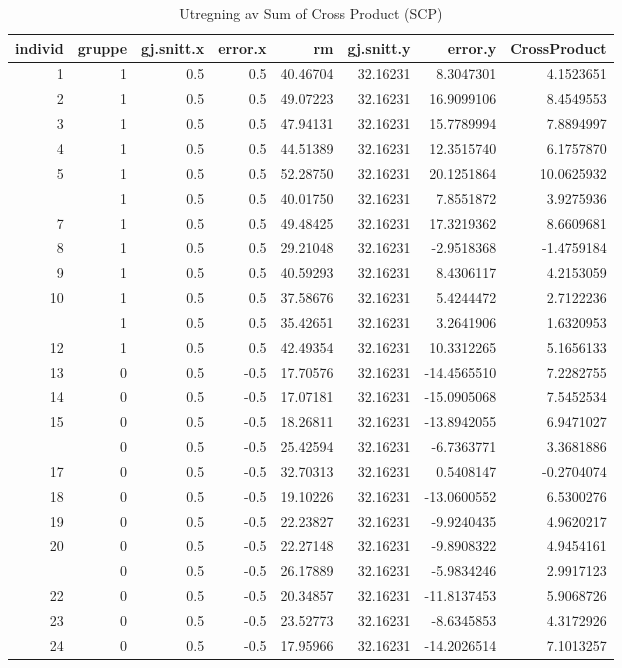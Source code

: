 \documentclass[
]{book}
\begin{document}
\begin{table}

\caption{\label{tab:unnamed-chunk-2}Utregning av Sum of Cross Product (SCP)}
\centering
\begin{tabular}[t]{rrrrrrrr}
\toprule
individ & gruppe & gj.snitt.x & error.x & rm & gj.snitt.y & error.y & CrossProduct\\
\midrule
1 & 1 & 0.5 & 0.5 & 40.46704 & 32.16231 & 8.3047301 & 4.1523651\\
2 & 1 & 0.5 & 0.5 & 49.07223 & 32.16231 & 16.9099106 & 8.4549553\\
3 & 1 & 0.5 & 0.5 & 47.94131 & 32.16231 & 15.7789994 & 7.8894997\\
4 & 1 & 0.5 & 0.5 & 44.51389 & 32.16231 & 12.3515740 & 6.1757870\\
5 & 1 & 0.5 & 0.5 & 52.28750 & 32.16231 & 20.1251864 & 10.0625932\\
\addlinespace
6 & 1 & 0.5 & 0.5 & 40.01750 & 32.16231 & 7.8551872 & 3.9275936\\
7 & 1 & 0.5 & 0.5 & 49.48425 & 32.16231 & 17.3219362 & 8.6609681\\
8 & 1 & 0.5 & 0.5 & 29.21048 & 32.16231 & -2.9518368 & -1.4759184\\
9 & 1 & 0.5 & 0.5 & 40.59293 & 32.16231 & 8.4306117 & 4.2153059\\
10 & 1 & 0.5 & 0.5 & 37.58676 & 32.16231 & 5.4244472 & 2.7122236\\
\addlinespace
11 & 1 & 0.5 & 0.5 & 35.42651 & 32.16231 & 3.2641906 & 1.6320953\\
12 & 1 & 0.5 & 0.5 & 42.49354 & 32.16231 & 10.3312265 & 5.1656133\\
13 & 0 & 0.5 & -0.5 & 17.70576 & 32.16231 & -14.4565510 & 7.2282755\\
14 & 0 & 0.5 & -0.5 & 17.07181 & 32.16231 & -15.0905068 & 7.5452534\\
15 & 0 & 0.5 & -0.5 & 18.26811 & 32.16231 & -13.8942055 & 6.9471027\\
\addlinespace
16 & 0 & 0.5 & -0.5 & 25.42594 & 32.16231 & -6.7363771 & 3.3681886\\
17 & 0 & 0.5 & -0.5 & 32.70313 & 32.16231 & 0.5408147 & -0.2704074\\
18 & 0 & 0.5 & -0.5 & 19.10226 & 32.16231 & -13.0600552 & 6.5300276\\
19 & 0 & 0.5 & -0.5 & 22.23827 & 32.16231 & -9.9240435 & 4.9620217\\
20 & 0 & 0.5 & -0.5 & 22.27148 & 32.16231 & -9.8908322 & 4.9454161\\
\addlinespace
21 & 0 & 0.5 & -0.5 & 26.17889 & 32.16231 & -5.9834246 & 2.9917123\\
22 & 0 & 0.5 & -0.5 & 20.34857 & 32.16231 & -11.8137453 & 5.9068726\\
23 & 0 & 0.5 & -0.5 & 23.52773 & 32.16231 & -8.6345853 & 4.3172926\\
24 & 0 & 0.5 & -0.5 & 17.95966 & 32.16231 & -14.2026514 & 7.1013257\\
\bottomrule
\end{tabular}
\end{table}
\end{document}
